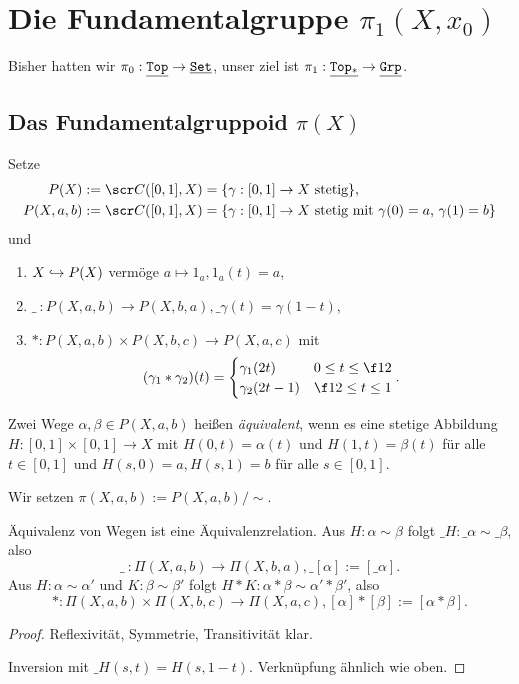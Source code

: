 \chapter{Die Fundamentalgruppe $\pi_1(X, x_0)$}



Bisher hatten wir $\pi_0: \underline{\mathtt{Top}} \to \underline{\mathtt{Set}}$, unser ziel ist $\pi_1: \underline{\mathtt{Top_*}} \to \underline{\mathtt{Grp}}$.


\section{Das Fundamentalgruppoid $\pi(X)$}


\begin{df}
	Setze
	\begin{align*}
		P(X) &:= \scr C([0,1], X) = \{ \gamma : [0,1] \to X \text{ stetig} \}, \\
		P(X,a,b) &:= \scr C([0,1], X) = \{ \gamma : [0,1] \to X \text{ stetig mit $\gamma(0) = a$, $\gamma(1) = b$} \}
	\end{align*}
	und
	\begin{enumerate}[(1)]
		\item
			$X \hookrightarrow P(X)$ vermöge $a \mapsto 1_a, 1_a(t) = a$,
		\item
			$\_{\ }:P(X,a,b) \to P(X,b,a), \_\gamma(t) = \gamma(1-t)$,
		\item
			$*: P(X,a,b) \times P(X,b,c) \to P(X,a,c)$ mit
			\[
				(\gamma_1 * \gamma_2)(t) = \begin{cases}
					\gamma_1(2t) & 0 \le t \le \f 12 \\
					\gamma_2(2t-1) & \f 12 \le t \le 1
				\end{cases}.
			\]
	\end{enumerate}
\end{df}

\begin{df}
	Zwei Wege $\alpha, \beta \in P(X,a,b)$ heißen \emph{äquivalent}, wenn es eine stetige Abbildung $H: [0,1] \times [0,1] \to X$ mit $H(0,t) = \alpha(t)$ und $H(1,t) = \beta(t)$ für alle $t \in [0,1]$ und $H(s,0) = a, H(s, 1) = b$ für alle $s \in [0,1]$.

	Wir setzen $\pi(X,a,b) := P(X,a,b) / \sim$.
\end{df}



\begin{prop}
	Äquivalenz von Wegen ist eine Äquivalenzrelation.
	Aus $H: \alpha \sim \beta$ folgt $\_H: \_\alpha \sim \_\beta$, also
	\[
		\_{\ }: \Pi(X, a, b) \to \Pi(X, b, a), \_{[\alpha]} := [\_\alpha].
	\]
	Aus $H: \alpha \sim \alpha'$ und $K: \beta \sim \beta'$ folgt $H*K: \alpha * \beta \sim \alpha'*\beta'$, also
	\[
		*: \Pi(X, a, b) \times \Pi(X, b, c) \to \Pi(X, a, c), [\alpha] * [\beta] := [\alpha * \beta].
	\]
	\begin{proof}
		Reflexivität, Symmetrie, Transitivität klar.

		Inversion mit $\_H(s,t) = H(s,1-t)$.
		Verknüpfung ähnlich wie oben.
	\end{proof}
\end{prop}

